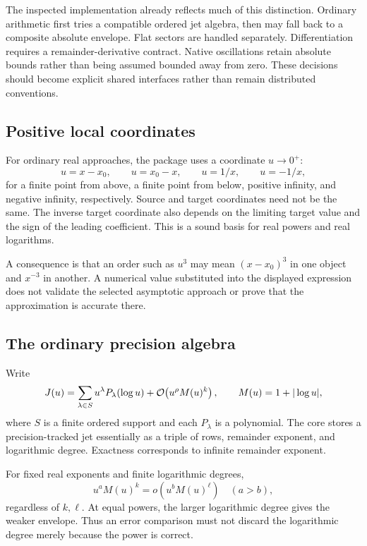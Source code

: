 The inspected implementation already reflects much of this distinction. Ordinary arithmetic first tries a compatible ordered jet algebra, then may fall back to a composite absolute envelope. Flat sectors are handled separately. Differentiation requires a remainder-derivative contract. Native oscillations retain absolute bounds rather than being assumed bounded away from zero. These decisions should become explicit shared interfaces rather than remain distributed conventions.\cite{operations,arithmetic,native}

\subsection{Positive local coordinates}

For ordinary real approaches, the package uses a coordinate $u\to0^+$:
\[
 u=x-x_0,\qquad u=x_0-x,\qquad u=1/x,\qquad u=-1/x,
\]
for a finite point from above, a finite point from below, positive infinity, and negative infinity, respectively. Source and target coordinates need not be the same. The inverse target coordinate also depends on the limiting target value and the sign of the leading coefficient. This is a sound basis for real powers and real logarithms.\cite{core,guide}

A consequence is that an order such as $u^3$ may mean $(x-x_0)^3$ in one object and $x^{-3}$ in another. A numerical value substituted into the displayed expression does not validate the selected asymptotic approach or prove that the approximation is accurate there.

\subsection{The ordinary precision algebra}

Write
\begin{equation}\label{eq:jet}
 J(u)=\sum_{\lambda\in S}u^\lambda P_\lambda(\log u)
       +\mathcal O\!\left(u^\rho M(u)^k\right),\qquad
 M(u)=1+|\log u|,
\end{equation}
where $S$ is a finite ordered support and each $P_\lambda$ is a polynomial. The core stores a precision-tracked jet essentially as a triple of rows, remainder exponent, and logarithmic degree. Exactness corresponds to infinite remainder exponent.\cite{core}

For fixed real exponents and finite logarithmic degrees,
\[
 u^a M(u)^k=o\!\left(u^b M(u)^\ell\right)\quad(a>b),
\]
regardless of $k,\ell$. At equal powers, the larger logarithmic degree gives the weaker envelope. Thus an error comparison must not discard the logarithmic degree merely because the power is correct.

